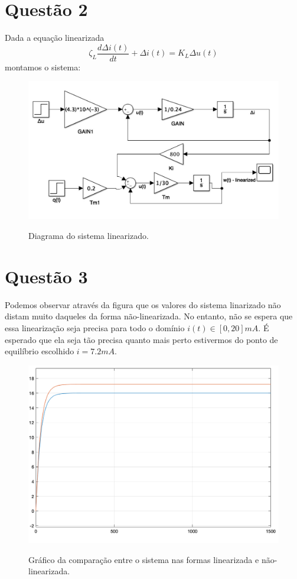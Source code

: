 \documentclass[11pt]{article}
\begin{document}
\section{Questão 2}
Dada a equação linearizada
\begin{equation}
	\zeta_{L}\frac{d\Delta i(t)}{dt} + \Delta i(t) = K_{L}\Delta u (t)
\end{equation}
montamos o sistema:
\begin{figure}[H]
	\centering
	{\includegraphics[width=\textwidth]
		{assets/q2_linearized_schema.jpg}}
	\caption{Diagrama do sistema linearizado.}
\end{figure}

\section{Questão 3}

Podemos observar através da figura que os valores do sistema linarizado não distam muito daqueles da forma
não-linearizada. No entanto, não se espera que essa linearização seja precisa para todo o domínio $i(t) \in [0, 20]mA$.
É esperado que ela seja tão precisa quanto mais perto estivermos do ponto de equilíbrio escolhido $i = 7.2mA$.

\begin{figure}[H]
	\centering
	{\includegraphics[width=\textwidth]
		{assets/q3_u(t)_4to5_q(t)_0to1+4.png}}
	\caption{Gráfico da comparação entre o sistema nas formas linearizada e não-linearizada.}
\end{figure}
\end{document}
